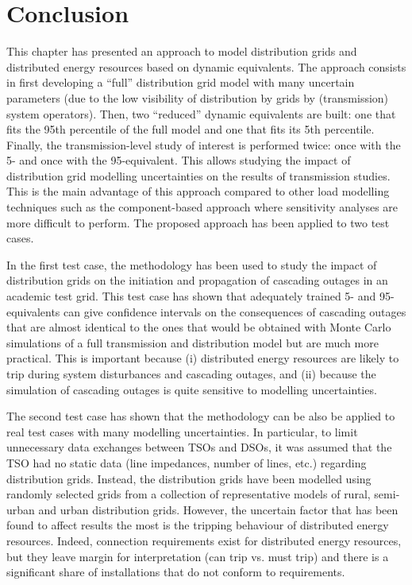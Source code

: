 \section{Conclusion}
\label{sec:distrib_conclusion}

This chapter has presented an approach to model distribution grids and distributed energy resources based on dynamic equivalents. The approach consists in first developing a ``full'' distribution grid model with many uncertain parameters (due to the low visibility of distribution by grids by (transmission) system operators). Then, two ``reduced'' dynamic equivalents are built: one that fits the 95th percentile of the full model and one that fits its 5th percentile. Finally, the transmission-level study of interest is performed twice: once with the 5- and once with the 95-equivalent. This allows studying the impact of distribution grid modelling uncertainties on the results of transmission studies. This is the main advantage of this approach compared to other load modelling techniques such as the component-based approach where sensitivity analyses are more difficult to perform. The proposed approach has been applied to two test cases.

In the first test case, the methodology has been used to study the impact of distribution grids on the initiation and propagation of cascading outages in an academic test grid. This test case has shown that adequately trained 5- and 95-equivalents can give confidence intervals on the consequences of cascading outages that are almost identical to the ones that would be obtained with Monte Carlo simulations of a full transmission and distribution model but are much more practical. This is important because (i) distributed energy resources are likely to trip during system disturbances and cascading outages, and (ii) because the simulation of cascading outages is quite sensitive to modelling uncertainties.

The second test case has shown that the methodology can be also be applied to real test cases with many modelling uncertainties. In particular, to limit unnecessary data exchanges between TSOs and DSOs, it was assumed that the TSO had no static data (line impedances, number of lines, etc.) regarding distribution grids. Instead, the distribution grids have been modelled using randomly selected grids from a collection of representative models of rural, semi-urban and urban distribution grids. However, the uncertain factor that has been found to affect results the most is the tripping behaviour of distributed energy resources. Indeed, connection requirements exist for distributed energy resources, but they leave margin for interpretation (can trip vs. must trip) and there is a significant share of installations that do not conform to requirements.

